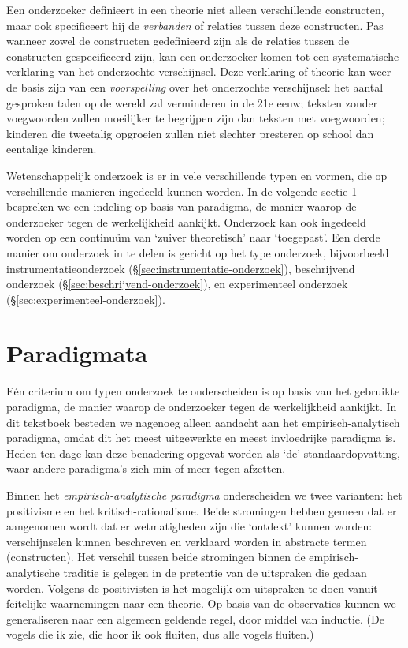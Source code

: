 \documentclass[
]{book}
\begin{document}
Een onderzoeker definieert in een theorie niet alleen verschillende
constructen, maar ook specificeert hij de \emph{verbanden} of relaties tussen
deze constructen. Pas wanneer zowel de constructen gedefinieerd zijn als
de relaties tussen de constructen gespecificeerd zijn, kan een
onderzoeker komen tot een systematische verklaring van het onderzochte
verschijnsel. Deze verklaring of theorie kan weer de basis zijn van een
\emph{voorspelling} over het onderzochte verschijnsel: het aantal gesproken
talen op de wereld zal verminderen in de 21e eeuw; teksten zonder
voegwoorden zullen moeilijker te begrijpen zijn dan teksten met
voegwoorden; kinderen die tweetalig opgroeien zullen niet slechter
presteren op school dan eentalige kinderen.

Wetenschappelijk onderzoek is er in vele verschillende typen en vormen,
die op verschillende manieren ingedeeld kunnen worden. In de volgende sectie \ref{sec:paradigmata} bespreken we een indeling op basis van
paradigma, de manier waarop de onderzoeker tegen de werkelijkheid
aankijkt. Onderzoek kan ook ingedeeld worden op een continuüm van
`zuiver theoretisch' naar `toegepast'. Een derde manier om onderzoek in
te delen is gericht op het type onderzoek, bijvoorbeeld
instrumentatieonderzoek (§\ref{sec:instrumentatie-onderzoek}), beschrijvend onderzoek (§\ref{sec:beschrijvend-onderzoek}),
en experimenteel onderzoek (§\ref{sec:experimenteel-onderzoek}).

\section{Paradigmata}\label{sec:paradigmata}

Eén criterium om typen onderzoek te onderscheiden is op basis van het
gebruikte paradigma, de manier waarop de onderzoeker tegen de
werkelijkheid aankijkt. In dit tekstboek besteden we nagenoeg alleen
aandacht aan het empirisch-analytisch paradigma, omdat dit het meest
uitgewerkte en meest invloedrijke paradigma is. Heden ten dage kan deze
benadering opgevat worden als `de' standaardopvatting, waar andere
paradigma's zich min of meer tegen afzetten.

Binnen het \emph{empirisch-analytische paradigma} onderscheiden we twee
varianten: het positivisme en het kritisch-rationalisme. Beide
stromingen hebben gemeen dat er aangenomen wordt dat er wetmatigheden
zijn die `ontdekt' kunnen worden: verschijnselen kunnen beschreven en
verklaard worden in abstracte termen (constructen). Het verschil tussen
beide stromingen binnen de empirisch-analytische traditie is gelegen in
de pretentie van de uitspraken die gedaan worden. Volgens de
positivisten is het mogelijk om uitspraken te doen vanuit feitelijke
waarnemingen naar een theorie. Op basis van de observaties kunnen we
generaliseren naar een algemeen geldende regel, door middel van
inductie. (De vogels die ik zie, die hoor ik ook fluiten, dus alle
vogels fluiten.)
\end{document}
